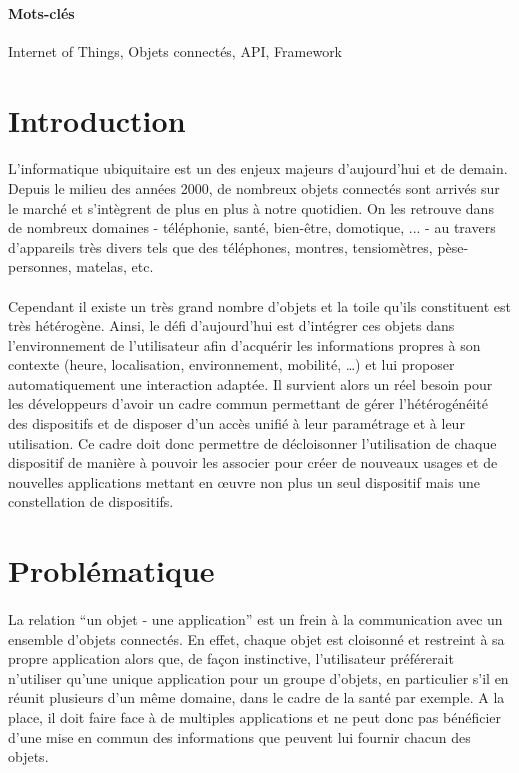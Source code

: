 \documentclass[nocopyrightspace]{sigplanconf}
\begin{document}
\paragraph{Mots-clés}
Internet of Things, Objets connectés, API, Framework

\tableofcontents

\section{Introduction}
	\paragraph{}
	L’informatique ubiquitaire est un des enjeux majeurs d’aujourd’hui et de demain. Depuis le milieu des années 2000, de nombreux objets connectés sont arrivés sur le marché et s'intègrent de plus en plus à notre quotidien. On les retrouve dans de nombreux domaines - téléphonie, santé, bien-être, domotique, ... - au travers d'appareils très divers tels que des téléphones, montres, tensiomètres, pèse-personnes, matelas, etc.
	
	\paragraph{}
	Cependant il existe un très grand nombre d'objets et la toile qu'ils constituent est très hétérogène. Ainsi, le défi d’aujourd’hui est d'intégrer ces objets dans l'environnement de l'utilisateur afin d’acquérir les informations propres à son contexte (heure, localisation, environnement, mobilité, …) et lui proposer automatiquement une interaction adaptée. Il survient alors un réel besoin pour les développeurs d'avoir un cadre commun permettant de gérer l'hétérogénéité des dispositifs et de disposer d'un accès unifié à leur paramétrage et à leur utilisation. Ce cadre doit donc permettre de décloisonner l'utilisation de chaque dispositif de manière à pouvoir les associer pour créer de nouveaux usages et de nouvelles applications mettant en œuvre non plus un seul dispositif mais une constellation de dispositifs. 

\section{Problématique}
	\paragraph{}
	La relation “un objet - une application” est un frein à la communication avec un ensemble d’objets connectés. En effet, chaque objet est cloisonné et restreint à sa propre application alors que, de façon instinctive, l’utilisateur préférerait n’utiliser qu’une unique application pour un groupe d’objets, en particulier s’il en réunit plusieurs d’un même domaine, dans le cadre de la santé par exemple. A la place, il doit faire face à de multiples applications et ne peut donc pas bénéficier d’une mise en commun des informations que peuvent lui fournir chacun des objets.
\end{document}
